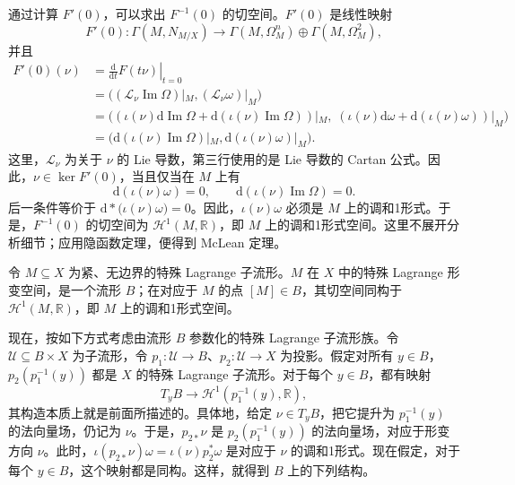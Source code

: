 通过计算 $F'(0)$，可以求出 $F^{-1}(0)$ 的切空间。$F'(0)$ 是线性映射
\[
F'(0)\colon\Gamma(M,N_{M/X})
\longrightarrow\Gamma(M,\Omega_M^n)\oplus\Gamma(M,\Omega_M^2),
\]
并且
\[
\begin{aligned}
F'(0)(\nu)
&=\left.\frac{\mathrm d}{\mathrm dt}F(t\nu)\right|_{t=0}\\
&=\bigl((\mathcal L_\nu\operatorname{Im}\Omega)|_M,
          (\mathcal L_\nu\omega)|_M\bigr)\\
&=\bigl((\iota(\nu)\mathrm d\operatorname{Im}\Omega
        +\mathrm d(\iota(\nu)\operatorname{Im}\Omega))|_M,\;
        (\iota(\nu)\mathrm d\omega+\mathrm d(\iota(\nu)\omega))|_M\bigr)\\
&=\bigl(\mathrm d(\iota(\nu)\operatorname{Im}\Omega)|_M,
         \mathrm d(\iota(\nu)\omega)|_M\bigr).
\end{aligned}
\]
这里，$\mathcal L_\nu$ 为关于 $\nu$ 的 Lie 导数，第三行使用的是 Lie 导数的 Cartan 公式。因此，$\nu\in\ker F'(0)$，当且仅当在 $M$ 上有
\[
\mathrm d(\iota(\nu)\omega)=0,
\qquad
\mathrm d(\iota(\nu)\operatorname{Im}\Omega)=0.
\]
后一条件等价于 $\mathrm d*\bigl(\iota(\nu)\omega\bigr)=0$。因此，$\iota(\nu)\omega$ 必须是 $M$ 上的调和1形式。于是，$F^{-1}(0)$ 的切空间为 $\mathcal H^1(M,\mathbb R)$，即 $M$ 上的调和1形式空间。这里不展开分析细节；应用隐函数定理，便得到 McLean 定理。

\begin{theorem}\label{thm:6.2}
令 $M\subseteq X$ 为紧、无边界的特殊 Lagrange 子流形。$M$ 在 $X$ 中的特殊 Lagrange 形变空间，是一个流形 $B$；在对应于 $M$ 的点 $[M]\in B$，其切空间同构于 $\mathcal H^1(M,\mathbb R)$，即 $M$ 上的调和1形式空间。
\end{theorem}

现在，按如下方式考虑由流形 $B$ 参数化的特殊 Lagrange 子流形族。令 $\mathcal U\subseteq B\times X$ 为子流形，令 $p_1\colon\mathcal U\to B$、$p_2\colon\mathcal U\to X$ 为投影。假定对所有 $y\in B$，$p_2(p_1^{-1}(y))$ 都是 $X$ 的特殊 Lagrange 子流形。对于每个 $y\in B$，都有映射
\[
T_yB\longrightarrow\mathcal H^1(p_1^{-1}(y),\mathbb R),
\]
其构造本质上就是前面所描述的。具体地，给定 $\nu\in T_yB$，把它提升为 $p_1^{-1}(y)$ 的法向量场，仍记为 $\nu$。于是，$p_{2*}\nu$ 是 $p_2(p_1^{-1}(y))$ 的法向量场，对应于形变方向 $\nu$。此时，$\iota(p_{2*}\nu)\omega=\iota(\nu)p_2^*\omega$ 是对应于 $\nu$ 的调和1形式。现在假定，对于每个 $y\in B$，这个映射都是同构。这样，就得到 $B$ 上的下列结构。

